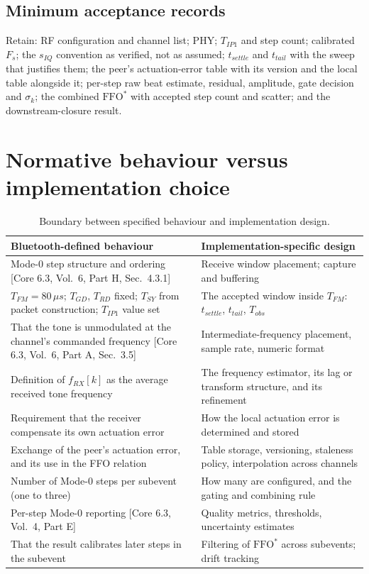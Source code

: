 \documentclass[11pt,a4paper]{article}
\newcommand{\us}{\,\ensuremath{\upmu}s}
\newcommand{\FFO}{\mathrm{FFO}}
\newcommand{\Tsy}{T_{SY}}
\newcommand{\Tgd}{T_{GD}}
\newcommand{\Tfm}{T_{FM}}
\newcommand{\Trd}{T_{RD}}
\newcommand{\Tipone}{T_{IP1}}
\providecommand{\upmu}{\mu}
\newcommand{\core}[1]{\textcolor{rulegrey}{\small[Core 6.3, #1]}}
\begin{document}
\subsection{Minimum acceptance records}

Retain: RF configuration and channel list; PHY; $\Tipone$ and step count; calibrated $F_s$; the
$s_{IQ}$ convention as verified, not as assumed; $t_{settle}$ and $t_{tail}$ with the sweep that
justifies them; the peer's actuation-error table with its version and the local table alongside it;
per-step raw beat estimate, residual, amplitude, gate decision and $\sigma_k$; the combined
$\FFO^{*}$ with accepted step count and scatter; and the downstream-closure result.

\section{Normative behaviour versus implementation choice}

\begin{table}[htb]
\caption{Boundary between specified behaviour and implementation design.}
\label{tab:normvsimpl}
\centering\small
\begin{tabular}{@{}L{62mm}L{62mm}@{}}
\toprule
Bluetooth-defined behaviour & Implementation-specific design \\
\midrule
Mode-0 step structure and ordering \core{Vol.\ 6, Part H, Sec.\ 4.3.1} & Receive window placement; capture and buffering \\
$\Tfm = 80\us$; $\Tgd$, $\Trd$ fixed; $\Tsy$ from packet construction; $\Tipone$ value set & The accepted window inside $\Tfm$: $t_{settle}$, $t_{tail}$, $T_{obs}$ \\
That the tone is unmodulated at the channel's commanded frequency \core{Vol.\ 6, Part A, Sec.\ 3.5} & Intermediate-frequency placement, sample rate, numeric format \\
Definition of $f_{RX}[k]$ as the average received tone frequency & The frequency estimator, its lag or transform structure, and its refinement \\
Requirement that the receiver compensate its own actuation error & How the local actuation error is determined and stored \\
Exchange of the peer's actuation error, and its use in the FFO relation & Table storage, versioning, staleness policy, interpolation across channels \\
Number of Mode-0 steps per subevent (one to three) & How many are configured, and the gating and combining rule \\
Per-step Mode-0 reporting \core{Vol.\ 4, Part E} & Quality metrics, thresholds, uncertainty estimates \\
That the result calibrates later steps in the subevent & Filtering of $\FFO^{*}$ across subevents; drift tracking \\
\bottomrule
\end{tabular}
\end{table}
\end{document}

